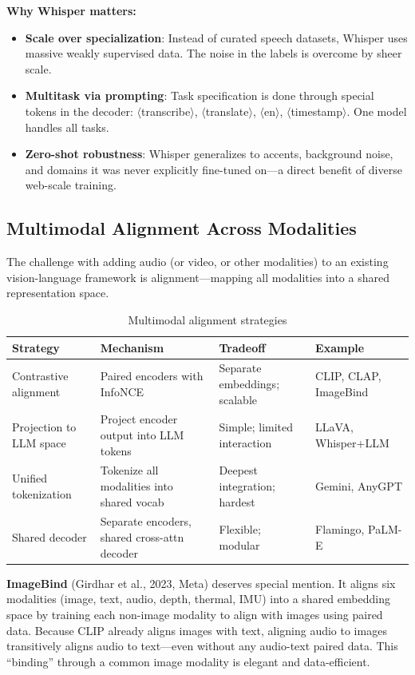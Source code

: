 \textbf{Why Whisper matters:}
\begin{itemize}
    \item \textbf{Scale over specialization}: Instead of curated speech datasets, Whisper uses massive weakly supervised data. The noise in the labels is overcome by sheer scale.
    \item \textbf{Multitask via prompting}: Task specification is done through special tokens in the decoder: $\langle$transcribe$\rangle$, $\langle$translate$\rangle$, $\langle$en$\rangle$, $\langle$timestamp$\rangle$. One model handles all tasks.
    \item \textbf{Zero-shot robustness}: Whisper generalizes to accents, background noise, and domains it was never explicitly fine-tuned on---a direct benefit of diverse web-scale training.
\end{itemize}

\subsection{Multimodal Alignment Across Modalities}

The challenge with adding audio (or video, or other modalities) to an existing vision-language framework is alignment---mapping all modalities into a shared representation space.

\begin{table}[H]
\centering
\caption{Multimodal alignment strategies}
\begin{tabularx}{\textwidth}{lXXl}
\toprule
\textbf{Strategy} & \textbf{Mechanism} & \textbf{Tradeoff} & \textbf{Example} \\
\midrule
Contrastive alignment & Paired encoders with InfoNCE & Separate embeddings; scalable & CLIP, CLAP, ImageBind \\
Projection to LLM space & Project encoder output into LLM tokens & Simple; limited interaction & LLaVA, Whisper+LLM \\
Unified tokenization & Tokenize all modalities into shared vocab & Deepest integration; hardest & Gemini, AnyGPT \\
Shared decoder & Separate encoders, shared cross-attn decoder & Flexible; modular & Flamingo, PaLM-E \\
\bottomrule
\end{tabularx}
\end{table}

\textbf{ImageBind} (Girdhar et al., 2023, Meta) deserves special mention. It aligns six modalities (image, text, audio, depth, thermal, IMU) into a shared embedding space by training each non-image modality to align with images using paired data. Because CLIP already aligns images with text, aligning audio to images transitively aligns audio to text---even without any audio-text paired data. This ``binding'' through a common image modality is elegant and data-efficient.

